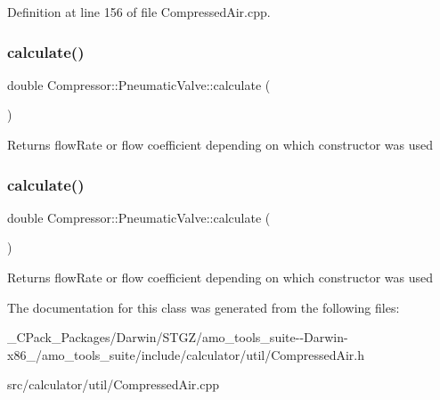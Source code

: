 Definition at line 156 of file Compressed\+Air.\+cpp.

\mbox{\label{class_compressor_1_1_pneumatic_valve_aa9e11ab6f1e75730519a69fccfaa53c2}} 
\subsubsection{\texorpdfstring{calculate()}{calculate()}\hspace{0.1cm}{\footnotesize\ttfamily [2/3]}}
{\footnotesize\ttfamily double Compressor\+::\+Pneumatic\+Valve\+::calculate (\begin{DoxyParamCaption}{ }\end{DoxyParamCaption})}

\begin{DoxyReturn}{Returns}
flow\+Rate or flow coefficient depending on which constructor was used 
\end{DoxyReturn}
\mbox{\label{class_compressor_1_1_pneumatic_valve_aa9e11ab6f1e75730519a69fccfaa53c2}} 
\subsubsection{\texorpdfstring{calculate()}{calculate()}\hspace{0.1cm}{\footnotesize\ttfamily [3/3]}}
{\footnotesize\ttfamily double Compressor\+::\+Pneumatic\+Valve\+::calculate (\begin{DoxyParamCaption}{ }\end{DoxyParamCaption})}

\begin{DoxyReturn}{Returns}
flow\+Rate or flow coefficient depending on which constructor was used 
\end{DoxyReturn}


The documentation for this class was generated from the following files\+:\begin{DoxyCompactItemize}
\item 
\+\_\+\+C\+Pack\+\_\+\+Packages/\+Darwin/\+S\+T\+G\+Z/amo\+\_\+tools\+\_\+suite-\/-\/\+Darwin-\/x86\+\_/amo\+\_\+tools\+\_\+suite/include/calculator/util/Compressed\+Air.\+h\item 
src/calculator/util/Compressed\+Air.\+cpp\end{DoxyCompactItemize}
